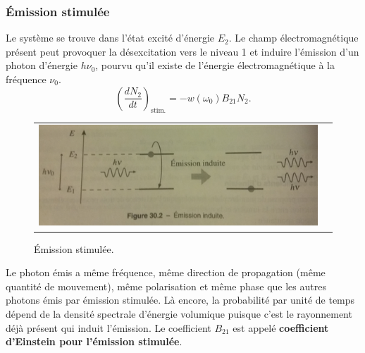 \documentclass[11pt,a4paper]{report}
\begin{document}
\subsubsection{Émission stimulée}
Le système se trouve dans l'état excité d'énergie $E_2$. Le champ électromagnétique présent peut provoquer la désexcitation vers le niveau 1 et induire l'émission d'un photon d'énergie $h\nu_0$, pourvu qu'il existe de l'énergie électromagnétique à la fréquence $\nu_0$.
\begin{equation}
	\boxed{\left(\frac{dN_2}{dt} \right)_\text{stim.} = - w(\omega_0)B_{21}N_2}.
\end{equation}
\begin{figure}[h!]
\begin{center}
	\begin{tabular}{cc}
		\includegraphics[scale = 0.55]{stimulee.png}
	\end{tabular}
\end{center}
\caption{Émission stimulée.}
\end{figure}

Le photon émis a même fréquence, même direction de propagation (même quantité de mouvement), même polarisation et même phase que les autres photons émis par émission stimulée. Là encore, la probabilité par unité de temps dépend de la densité spectrale d'énergie volumique puisque c'est le rayonnement déjà présent qui induit l'émission. Le coefficient $B_{21}$ est appelé \textbf{coefficient d'Einstein pour l'émission stimulée}. 
\end{document}
